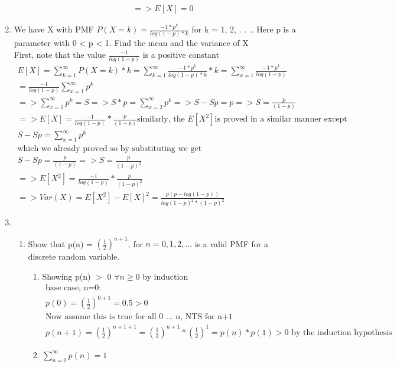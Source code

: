\documentclass[11pt]{article}
\begin{document}
\begin{enumerate}
\begin{enumerate}
\begin{gather}
		=> E[X] = 0
	\end{gather}
\end{enumerate}
\item We have X with PMF $P(X = k) = \frac{-1*p^k}{log(1-p)*k}$
for k = 1, 2, . . .. Here p is a parameter with 0 < p < 1. Find the mean and the variance of X
\\
First, note that the value $\frac{-1}{log(1-p)}$ is a positive constant
\begin{gather}
	E[X] = \sum_{k=1}^{\infty} P(X=k)*k = \sum_{k=1}^{\infty} \frac{-1*p^k}{log(1-p)*k} * k = \sum_{x=1}^{\infty} \frac{-1*p^k}{log(1-p)} \\ 
	= \frac{-1}{log(1-p)} \sum_{x=1}^{\infty} p^k \\
	=> \sum_{x=1}^{\infty} p^k = S => S*p = \sum_{x=2}^{\infty} p^k => S-Sp = p => S= \frac{p}{(1-p)}\\
	=> E[X] = \frac{-1}{log(1-p)} * \frac{p}{(1-p)}
	\text{similarly, the }E[X^2] \text{is proved in a similar manner except} \\
	S-Sp = \sum_{x=1}^{\infty} p^k \\
	\text{which we already proved so by substituting we get}\\
	S-Sp =  \frac{p}{(1-p)} => S = \frac{p}{(1-p)^2}\\
	=> E[X^2] = \frac{-1}{log(1-p)} * \frac{p}{(1-p)^2}\\
	=>Var(X) = E[X^2]-E[X]^2 = \frac{p(p-log(1-p))}{log(1-p)^2*(1-p)^2}
\end{gather}	
\item
\begin{enumerate}
	\item  Show that p(n) = $(\frac{1}{2})^{n+1}$, for $n = 0, 1, 2, . . .$ is a valid PMF for a discrete random variable.
	\begin{enumerate}
		\item Showing p(n) $>$ 0 $\forall n \ge 0$ by induction 	
		\begin{gather}
				\text{base case, n=0:}\\
				p(0) = (\frac{1}{2}) ^ {0+1} = 0.5 > 0 \\
				\text{Now assume this is true for all 0 ... n, NTS for n+1}\\
				p(n+1) = (\frac{1}{2}) ^ {n+1+1} = (\frac{1}{2}) ^ {n+1} * (\frac{1}{2}) ^ {1} = p(n) * p(1) > 0 \text{ by the induction hypothesis} 
		\end{gather}
		\item $\sum_{n=0}^{\infty} p(n) = 1$\\

\end{enumerate}
\end{enumerate}
\end{enumerate}
\end{document}
